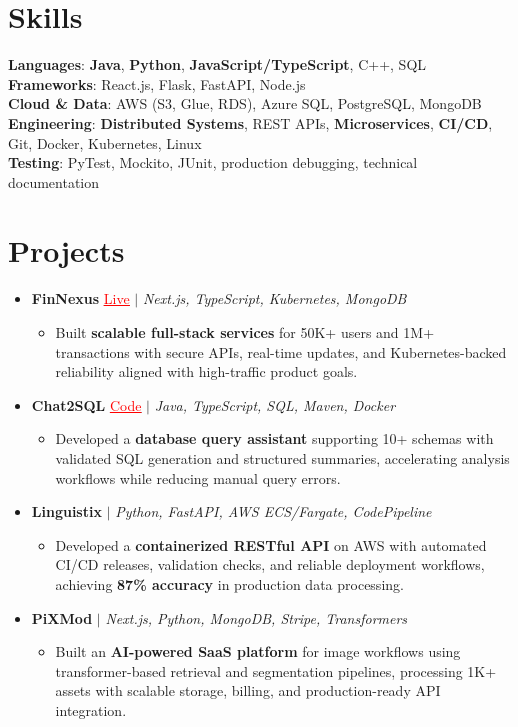 \documentclass[letterpaper,10pt]{article}
\newcommand{\resumeItem}[1]{\item\small{{#1 \vspace{-2pt}}}}
\newcommand{\resumeProjectHeading}[1]{\item \small #1 \vspace{-1pt}}
\newcommand{\resumeSubHeadingListStart}{\begin{itemize}[leftmargin=0.0in, label={}]}
\newcommand{\resumeSubHeadingListEnd}{\end{itemize}}
\newcommand{\resumeProjItemListStart}{\begin{itemize}[leftmargin=0.15in,label=\textbullet,itemsep=0pt,topsep=0pt,parsep=0pt,partopsep=0pt]}
\newcommand{\resumeProjItemListEnd}{\end{itemize}\vspace{-6pt}}
\begin{document}
\section{Skills}
\begin{itemize}[leftmargin=0.15in, label={}]
\small{\item{
\textbf{Languages}: \textbf{Java}, \textbf{Python}, \textbf{JavaScript/TypeScript}, C++, SQL \\
\textbf{Frameworks}: React.js, Flask, FastAPI, Node.js \\
\textbf{Cloud \& Data}: AWS (S3, Glue, RDS), Azure SQL, PostgreSQL, MongoDB \\
\textbf{Engineering}: \textbf{Distributed Systems}, REST APIs, \textbf{Microservices}, \textbf{CI/CD}, Git, Docker, Kubernetes, Linux \\
\textbf{Testing}: PyTest, Mockito, JUnit, production debugging, technical documentation
}}
\end{itemize}
\vspace{-15pt}
\section{Projects}
\resumeSubHeadingListStart
\vspace{-3pt}
\resumeProjectHeading{\textbf{FinNexus} {\href{https://fin-nexus.vercel.app/}{\textcolor{red}{\underline{Live}}}} $|$ \emph{Next.js, TypeScript, Kubernetes, MongoDB}}
\resumeProjItemListStart
\resumeItem{Built \textbf{scalable full-stack services} for 50K+ users and 1M+ transactions with secure APIs, real-time updates, and Kubernetes-backed reliability aligned with high-traffic product goals.}
\resumeProjItemListEnd
\resumeProjectHeading{\textbf{Chat2SQL} {\href{https://github.com/SAHAJ-BHADJA/Chat2SQL}{\textcolor{red}{\underline{Code}}}} $|$ \emph{Java, TypeScript, SQL, Maven, Docker}}
\resumeProjItemListStart
\resumeItem{Developed a \textbf{database query assistant} supporting 10+ schemas with validated SQL generation and structured summaries, accelerating analysis workflows while reducing manual query errors.}
\resumeProjItemListEnd
\resumeProjectHeading{\textbf{Linguistix} $|$ \emph{Python, FastAPI, AWS ECS/Fargate, CodePipeline}}
\resumeProjItemListStart
\resumeItem{Developed a \textbf{containerized RESTful API} on AWS with automated CI/CD releases, validation checks, and reliable deployment workflows, achieving \textbf{87\% accuracy} in production data processing.}
\resumeProjItemListEnd
\resumeProjectHeading{\textbf{PiXMod} $|$ \emph{Next.js, Python, MongoDB, Stripe, Transformers}}
\resumeProjItemListStart
\resumeItem{Built an \textbf{AI-powered SaaS platform} for image workflows using transformer-based retrieval and segmentation pipelines, processing 1K+ assets with scalable storage, billing, and production-ready API integration.}
\resumeProjItemListEnd
\resumeSubHeadingListEnd
\end{document}
